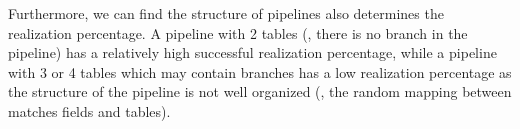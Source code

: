 Furthermore, we can find the structure of pipelines also determines the realization percentage. A pipeline with 2 tables (\ie, there is no branch in the pipeline) has a relatively high successful realization percentage, while a pipeline with 3 or 4 tables which may contain branches has a low realization percentage as the structure of the pipeline is not well organized (\ie, the random mapping between matches fields and tables).


